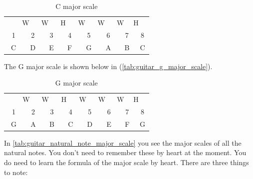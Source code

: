 \begin{table}[h]
	\centering
	\begin{tabular}{*{16}{c}}
		& \multicolumn{2}{P{4mm}}{\large{W}} & \multicolumn{2}{P{4mm}}{\large{W}} & \multicolumn{2}{P{4mm}}{\large{H}} & \multicolumn{2}{P{4mm}}{\large{W}} & \multicolumn{2}{P{4mm}}{\large{W}} & \multicolumn{2}{P{4mm}}{\large{W}} & \multicolumn{2}{P{4mm}}{\large{H}} & \\
		\multicolumn{2}{P{4mm}}{1} & \multicolumn{2}{P{4mm}}{2} & \multicolumn{2}{P{4mm}}{3} & \multicolumn{2}{P{4mm}}{4} & \multicolumn{2}{P{4mm}}{5} & \multicolumn{2}{P{4mm}}{6} & \multicolumn{2}{P{4mm}}{7} & \multicolumn{2}{P{4mm}}{8} \\
		\multicolumn{2}{P{4mm}}{C} & \multicolumn{2}{P{4mm}}{D} & \multicolumn{2}{P{4mm}}{E} & \multicolumn{2}{P{4mm}}{F} & \multicolumn{2}{P{4mm}}{G} & \multicolumn{2}{P{4mm}}{A} & \multicolumn{2}{P{4mm}}{B} & \multicolumn{2}{P{4mm}}{C}
	\end{tabular}
	\caption{C major scale}
	\label{tab:guitar_c_major_scale}
\end{table}

The G major scale is shown below in (\autoref{tab:guitar_g_major_scale}).

\begin{table}[h]
	\centering
	\begin{tabular}{*{16}{c}}
		& \multicolumn{2}{P{4mm}}{\large{W}} & \multicolumn{2}{P{4mm}}{\large{W}} & \multicolumn{2}{P{4mm}}{\large{H}} & \multicolumn{2}{P{4mm}}{\large{W}} & \multicolumn{2}{P{4mm}}{\large{W}} & \multicolumn{2}{P{4mm}}{\large{W}} & \multicolumn{2}{P{4mm}}{\large{H}} & \\
		\multicolumn{2}{P{4mm}}{1} & \multicolumn{2}{P{4mm}}{2} & \multicolumn{2}{P{4mm}}{3} & \multicolumn{2}{P{4mm}}{4} & \multicolumn{2}{P{4mm}}{5} & \multicolumn{2}{P{4mm}}{6} & \multicolumn{2}{P{4mm}}{7} & \multicolumn{2}{P{4mm}}{8} \\
		\multicolumn{2}{P{4mm}}{G} & \multicolumn{2}{P{4mm}}{A} & \multicolumn{2}{P{4mm}}{B} & \multicolumn{2}{P{4mm}}{C} & \multicolumn{2}{P{4mm}}{D} & \multicolumn{2}{P{4mm}}{E} & \multicolumn{2}{P{4mm}}{F\sharp} & \multicolumn{2}{P{4mm}}{G}
	\end{tabular}
	\caption{G major scale}
	\label{tab:guitar_g_major_scale}
\end{table}

In \autoref{tab:guitar_natural_note_major_scale} you see the major scales of all the natural notes. You don't need to remember these by heart at the moment. You do need to learn the formula of the major scale by heart. There are three things to note:

